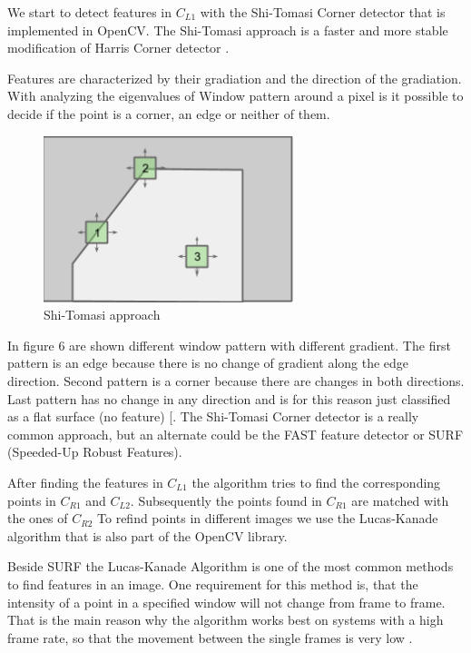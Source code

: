 \documentclass[11pt]{article}
\begin{document}
	We start to detect features in $C_{L1}$ with the Shi-Tomasi Corner detector that is implemented in OpenCV. The Shi-Tomasi approach is a faster and more stable modification of Harris Corner detector \cite{Shi-Tomasi_Wiki}. 

	Features are characterized by their gradiation and the direction of the gradiation. With analyzing the eigenvalues of Window pattern around a pixel is it possible to decide if the point is a corner, an edge or neither of them. 
	
	\begin{figure}[H]
		\centering
		\includegraphics[width=0.65\textwidth]{images/tomasi.png}
		\caption{Shi-Tomasi approach}
	\end{figure}
	
	In figure 6 are shown different window pattern with different gradient. The first pattern is an edge because there is no change of gradient along the edge direction. Second pattern is a corner because there are changes in both directions. Last pattern has no change in any direction and is for this reason just classified as a flat surface (no feature) [\cite{Shi-Tomasi, FeatureDetection}. The Shi-Tomasi Corner detector is a really common approach, but an alternate could be the FAST feature detector or SURF (Speeded-Up Robust Features). 

	After finding the features in $C_{L1}$ the algorithm tries to find the corresponding points in $C_{R1}$ and $C_{L2}$. Subsequently the points found in $C_{R1}$ are matched with the ones of $C_{R2}$
	To refind points in different images we use the Lucas-Kanade algorithm that is also part of the OpenCV library.

	Beside SURF the Lucas-Kanade Algorithm is one of the most common methods to find features in an image. One requirement for this method is, that the intensity of a point in a specified window will not change from frame to frame. That is the main reason why the algorithm works best on systems with a high frame rate, so that the movement between the single frames is very low \cite{Lucas_Kanade}.
\end{document}
